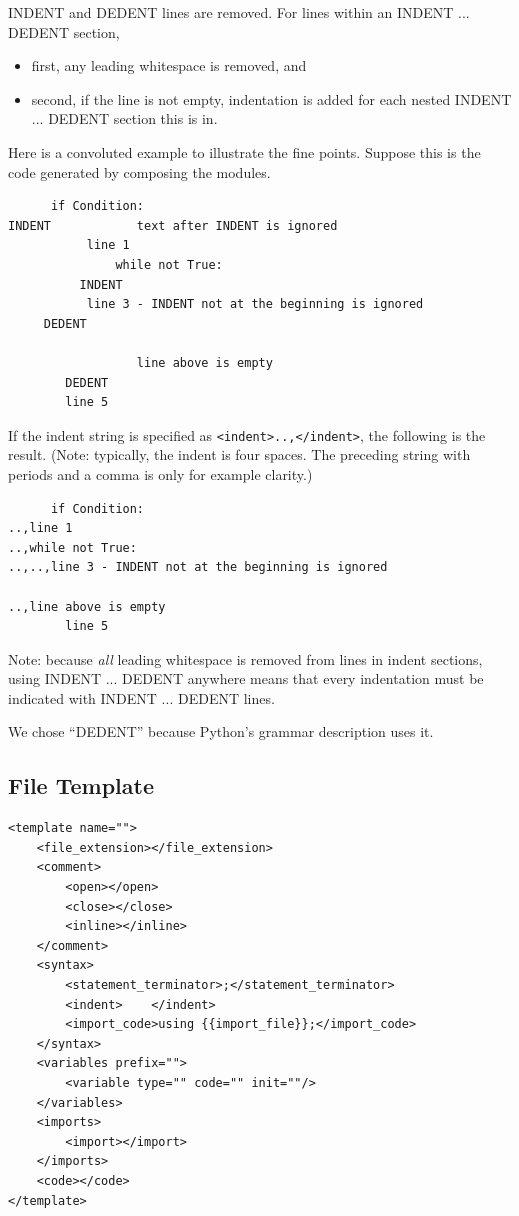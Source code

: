 INDENT and DEDENT lines are removed.
For lines within an INDENT ... DEDENT section,
\begin{itemize}[nosep]
\item first, any leading whitespace is removed, and
\item second, if the line is not empty, indentation is added for each nested
  INDENT ... DEDENT section this is in.
\end{itemize}

Here is a convoluted example to illustrate the fine points.  Suppose this is the
code generated by composing the modules.
\begin{verbatim}
      if Condition:
INDENT            text after INDENT is ignored
           line 1
               while not True:
          INDENT
           line 3 - INDENT not at the beginning is ignored
     DEDENT

                  line above is empty
        DEDENT
        line 5
\end{verbatim}
If the indent string is specified as \verb|<indent>..,</indent>|, the following is
the result. (Note: typically, the indent is four spaces. The preceding string with
periods and a comma is only for example clarity.)
\begin{verbatim}
      if Condition:
..,line 1
..,while not True:
..,..,line 3 - INDENT not at the beginning is ignored

..,line above is empty
        line 5
\end{verbatim}

Note: because \emph{all} leading whitespace is removed from lines in indent sections,
using INDENT ... DEDENT anywhere means that every indentation must be indicated
with INDENT ... DEDENT lines.

We chose ``DEDENT'' because Python's grammar description uses it.


\subsection{File Template}
\label{sec: file template}

\begin{verbatim}
<template name="">
    <file_extension></file_extension>
    <comment>
        <open></open>
        <close></close>
        <inline></inline>
    </comment>
    <syntax>
        <statement_terminator>;</statement_terminator>
        <indent>    </indent>
        <import_code>using {{import_file}};</import_code>
    </syntax>
    <variables prefix="">
        <variable type="" code="" init=""/>
    </variables>
    <imports>
        <import></import>
    </imports>
    <code></code>
</template>
\end{verbatim}

